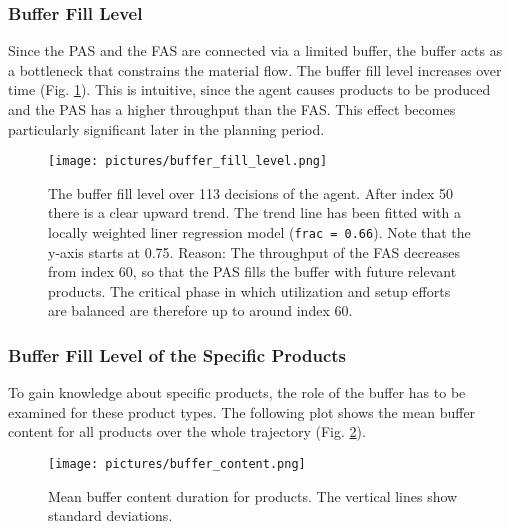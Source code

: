 \subsubsection{Buffer Fill Level}
Since the PAS and the FAS are connected via a limited buffer, the buffer acts as a bottleneck that constrains the material flow.
The buffer fill level increases over time (Fig. \ref{fig:buffer_fill_level}). This is intuitive, since the agent causes products to be produced and the PAS has a higher throughput than the FAS. This effect becomes particularly significant later in the planning period.
\begin{figure}[H]
    \centering
    \texttt{[image: pictures/buffer\_fill\_level.png]}
    \caption{The buffer fill level over 113 decisions of the agent. After index 50 there is a clear upward trend. The trend line has been fitted with a locally weighted liner regression model (\texttt{frac = 0.66}). Note that the y-axis starts at 0.75. Reason: The throughput of the FAS decreases from index 60, so that the PAS fills the buffer with future relevant products. The critical phase in which utilization and setup efforts are balanced are therefore up to around index 60.
    }
    \label{fig:buffer_fill_level}
\end{figure}

\subsubsection{Buffer Fill Level of the Specific Products}
To gain knowledge about specific products, the role of the buffer has to be examined for these product types. The following plot shows the mean buffer content for all products over the whole trajectory (Fig. \ref{fig:buffer_for_aggs}).

\begin{figure}[H]
    \centering
    \texttt{[image: pictures/buffer\_content.png]}
    \caption{Mean buffer content duration for products. The vertical lines show standard deviations.}
    \label{fig:buffer_for_aggs}
\end{figure}

